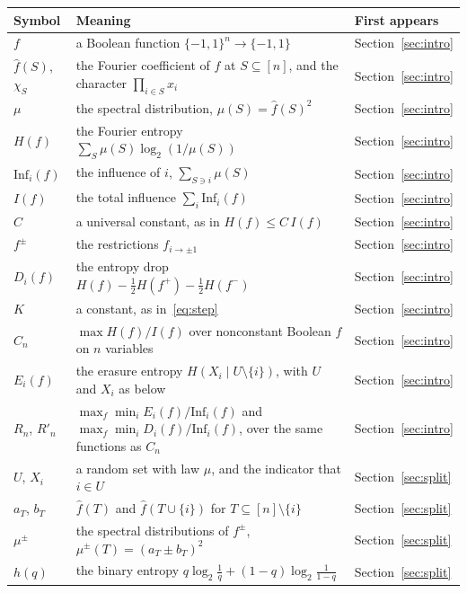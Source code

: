 \documentclass[11pt]{amsart}
\theoremstyle{remark}
\newcommand{\Inf}{\mathrm{Inf}}
\begin{document}
\begin{longtable}{@{}>{\raggedright\arraybackslash}p{}>{\raggedright\arraybackslash}p{}>{\raggedright\arraybackslash}p{}@{}}
\toprule
Symbol & Meaning & First appears \\
\midrule
\endhead
$f$ & a Boolean function $\{-1,1\}^n\to\{-1,1\}$ & Section~\ref{sec:intro} \\
$\hat f(S)$, $\chi_S$ & the Fourier coefficient of $f$ at $S\subseteq[n]$, and the character $\prod_{i\in S}x_i$ & Section~\ref{sec:intro} \\
$\mu$ & the spectral distribution, $\mu(S)=\hat f(S)^2$ & Section~\ref{sec:intro} \\
$H(f)$ & the Fourier entropy $\sum_S\mu(S)\log_2(1/\mu(S))$ & Section~\ref{sec:intro} \\
$\Inf_i(f)$ & the influence of $i$, $\sum_{S\ni i}\mu(S)$ & Section~\ref{sec:intro} \\
$I(f)$ & the total influence $\sum_i\Inf_i(f)$ & Section~\ref{sec:intro} \\
$C$ & a universal constant, as in $H(f)\le C\,I(f)$ & Section~\ref{sec:intro} \\
$f^\pm$ & the restrictions $f_{i\to\pm1}$ & Section~\ref{sec:intro} \\
$D_i(f)$ & the entropy drop $H(f)-\tfrac12H(f^+)-\tfrac12H(f^-)$ & Section~\ref{sec:intro} \\
$K$ & a constant, as in~\eqref{eq:step} & Section~\ref{sec:intro} \\
$C_n$ & $\max H(f)/I(f)$ over nonconstant Boolean $f$ on $n$ variables & Section~\ref{sec:intro} \\
$E_i(f)$ & the erasure entropy $H(X_i\mid U\setminus\{i\})$, with $U$ and $X_i$ as below & Section~\ref{sec:intro} \\
$R_n$, $R'_n$ & $\max_f\min_iE_i(f)/\Inf_i(f)$ and $\max_f\min_iD_i(f)/\Inf_i(f)$, over the same functions as $C_n$ & Section~\ref{sec:intro} \\
$U$, $X_i$ & a random set with law $\mu$, and the indicator that $i\in U$ & Section~\ref{sec:split} \\
$a_T$, $b_T$ & $\hat f(T)$ and $\hat f(T\cup\{i\})$ for $T\subseteq[n]\setminus\{i\}$ & Section~\ref{sec:split} \\
$\mu^\pm$ & the spectral distributions of $f^\pm$, $\mu^\pm(T)=(a_T\pm b_T)^2$ & Section~\ref{sec:split} \\
$h(q)$ & the binary entropy $q\log_2\frac1q+(1-q)\log_2\frac1{1-q}$ & Section~\ref{sec:split} \\

\end{longtable}
\end{document}
